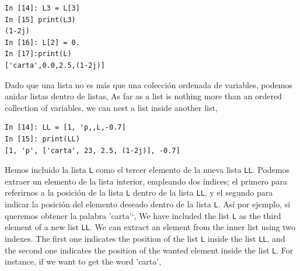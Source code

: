 \begin{center}
    \begin{minipage}{0.2\textwidth}
\begin{verbatim}
In [14]: L3 = L[3]
In [15] print(L3)
(1-2j)
In [16]: L[2] = 0.
In [17]:print(L)
['carta',0.0,2.5,(1-2j)]
\end{verbatim}        
    \end{minipage}
\end{center}

\begin{paracol}{2}
Dado que una lista no es más que una colección ordenada de variables, podemos anidar listas dentro de listas,
\switchcolumn
As far as a list is nothing more than an ordered collection of variables, we can nest a list inside another list,
\end{paracol}

\begin{center}
\begin{minipage}{0.3\textwidth}
\begin{verbatim}
In [14]: LL = [1, 'p,,L,-0.7]
In [15]: print(LL)
[1, 'p', ['carta', 23, 2.5, (1-2j)], -0.7]
\end{verbatim}
\end{minipage}
\end{center}

\begin{paracol}{2}
Hemos incluido la lista \texttt{L} como el tercer elemento de la nueva lista \texttt{LL}. Podemos extraer un elemento de la lista interior, empleando dos índices; el primero para referirnos a la posición de la lista \texttt{L} dentro de la lista  \texttt{LL}, y el segundo para indicar la posición del elemento deseado dentro de la lista \texttt{L}. Así por ejemplo, si queremos obtener la palabra 'carta'`,
\switchcolumn
We have included the list \texttt{L} as the third element of a new list \texttt{LL}. We can extract an element from the inner list using two indexes. The first one indicates the position of the list \texttt{L} inside the list \texttt{LL}, and the second one indicates the position of the wanted element inside the list \texttt{L}. For instance, if we want to get the word 'carta',
\end{paracol}


